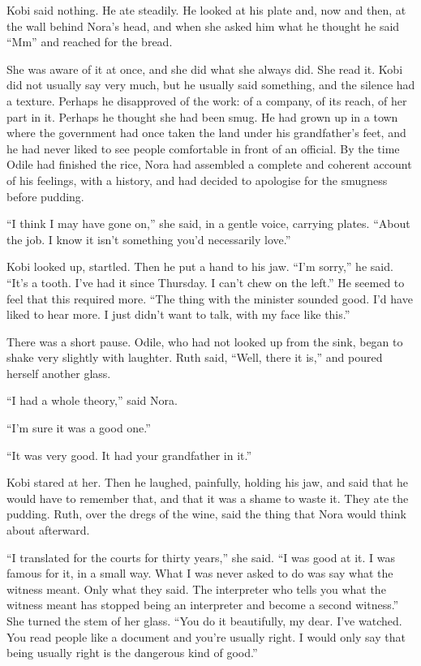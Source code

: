 Kobi said nothing. He ate steadily. He looked at his plate and, now and then, at the wall behind Nora's head, and when she asked him what he thought he said ``Mm'' and reached for the bread.

She was aware of it at once, and she did what she always did. She read it. Kobi did not usually say very much, but he usually said something, and the silence had a texture. Perhaps he disapproved of the work: of a company, of its reach, of her part in it. Perhaps he thought she had been smug. He had grown up in a town where the government had once taken the land under his grandfather's feet, and he had never liked to see people comfortable in front of an official. By the time Odile had finished the rice, Nora had assembled a complete and coherent account of his feelings, with a history, and had decided to apologise for the smugness before pudding.

``I think I may have gone on,'' she said, in a gentle voice, carrying plates. ``About the job. I know it isn't something you'd necessarily love.''

Kobi looked up, startled. Then he put a hand to his jaw. ``I'm sorry,'' he said. ``It's a tooth. I've had it since Thursday. I can't chew on the left.'' He seemed to feel that this required more. ``The thing with the minister sounded good. I'd have liked to hear more. I just didn't want to talk, with my face like this.''

There was a short pause. Odile, who had not looked up from the sink, began to shake very slightly with laughter. Ruth said, ``Well, there it is,'' and poured herself another glass.

``I had a whole theory,'' said Nora.

``I'm sure it was a good one.''

``It was very good. It had your grandfather in it.''

Kobi stared at her. Then he laughed, painfully, holding his jaw, and said that he would have to remember that, and that it was a shame to waste it. They ate the pudding. Ruth, over the dregs of the wine, said the thing that Nora would think about afterward.

``I translated for the courts for thirty years,'' she said. ``I was good at it. I was famous for it, in a small way. What I was never asked to do was say what the witness meant. Only what they said. The interpreter who tells you what the witness meant has stopped being an interpreter and become a second witness.'' She turned the stem of her glass. ``You do it beautifully, my dear. I've watched. You read people like a document and you're usually right. I would only say that being usually right is the dangerous kind of good.''

